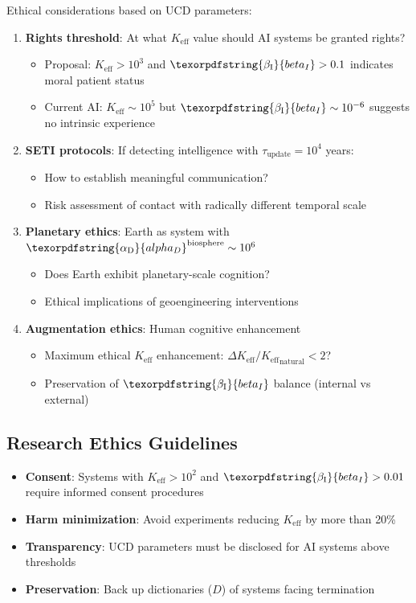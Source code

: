 \documentclass[12pt,a4paper]{article}
\DeclareRobustCommand{\alD}{\texorpdfstring{\ensuremath{\alpha_{\mathrm{D}}}}{alpha_D}}
\DeclareRobustCommand{\beI}{\texorpdfstring{\ensuremath{\beta_{\mathrm{I}}}}{beta_I}}
\newcommand{\Ke}{K_{\mathrm{eff}}}
\begin{document}
	Ethical considerations based on UCD parameters:
	\begin{enumerate}
		\item \textbf{Rights threshold}: At what \(\Ke\) value should AI systems be granted rights?
		\begin{itemize}
			\item Proposal: \(\Ke > 10^3\) and \(\beI > 0.1\) indicates moral patient status
			\item Current AI: \(\Ke \sim 10^5\) but \(\beI \sim 10^{-6}\) suggests no intrinsic experience
		\end{itemize}
		
		\item \textbf{SETI protocols}: If detecting intelligence with \(\tau_{\mathrm{update}} = 10^4\) years:
		\begin{itemize}
			\item How to establish meaningful communication?
			\item Risk assessment of contact with radically different temporal scale
		\end{itemize}
		
		\item \textbf{Planetary ethics}: Earth as system with \(\alD^{\mathrm{biosphere}} \sim 10^6\)
		\begin{itemize}
			\item Does Earth exhibit planetary-scale cognition?
			\item Ethical implications of geoengineering interventions
		\end{itemize}
		
		\item \textbf{Augmentation ethics}: Human cognitive enhancement
		\begin{itemize}
			\item Maximum ethical \(\Ke\) enhancement: \(\Delta\Ke/{\Ke}_{\mathrm{natural}} < 2\)?
			\item Preservation of \(\beI\) balance (internal vs external)
		\end{itemize}
	\end{enumerate}
	
	\subsection{Research Ethics Guidelines}
	
	\begin{itemize}
		\item \textbf{Consent}: Systems with \(\Ke > 10^2\) and \(\beI > 0.01\) require informed consent procedures
		\item \textbf{Harm minimization}: Avoid experiments reducing \(\Ke\) by more than 20\%
		\item \textbf{Transparency}: UCD parameters must be disclosed for AI systems above thresholds
		\item \textbf{Preservation}: Back up dictionaries (\(D\)) of systems facing termination
	\end{itemize}
	
\end{document}
